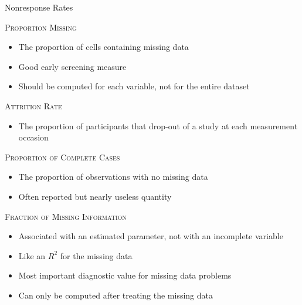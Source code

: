 \documentclass{beamer}\usepackage[]{graphicx}\usepackage[]{color}
\newcommand{\rmsc}[1]{\textrm{\textsc{#1}}}
\begin{document}
\begin{frame}[allowframebreaks]{Nonresponse Rates}
  
  \rmsc{Proportion Missing}
  \begin{itemize}
  \item The proportion of cells containing missing data
  \item Good early screening measure
  \item Should be computed for each variable, not for the entire dataset
  \end{itemize}
  
  \va
  
  \rmsc{Attrition Rate}
  \begin{itemize}
  \item The proportion of participants that drop-out of a study at each 
    measurement occasion
  \end{itemize}
  
  \pagebreak
  
  \rmsc{Proportion of Complete Cases}
  \begin{itemize}
  \item The proportion of observations with no missing data
  \item Often reported but nearly useless quantity
  \end{itemize}
  
  \va
  
  \rmsc{Fraction of Missing Information}
  \begin{itemize}
  \item Associated with an estimated parameter, not with an incomplete variable
  \item Like an $R^2$ for the missing data
  \item Most important diagnostic value for missing data problems
  \item Can only be computed after treating the missing data
  \end{itemize}
  
\end{frame}

\end{document}
